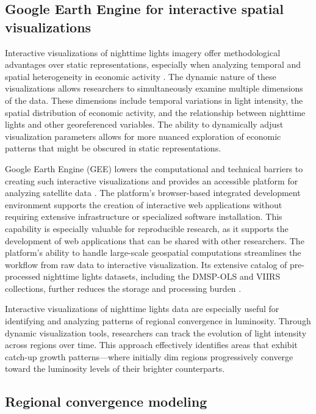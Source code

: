 \documentclass[
  a4paper, 
  twoside,
  review
]{article}
\begin{document}
\subsection{Google Earth Engine for interactive spatial
visualizations}\label{google-earth-engine-for-interactive-spatial-visualizations}

Interactive visualizations of nighttime lights imagery offer
methodological advantages over static representations, especially when
analyzing temporal and spatial heterogeneity in economic activity
\citep{donaldson_storeygard_remotesensing}. The dynamic nature of these
visualizations allows researchers to simultaneously examine multiple
dimensions of the data. These dimensions include temporal variations in
light intensity, the spatial distribution of economic activity, and the
relationship between nighttime lights and other georeferenced variables.
The ability to dynamically adjust visualization parameters allows for
more nuanced exploration of economic patterns that might be obscured in
static representations.

Google Earth Engine (GEE) lowers the computational and technical
barriers to creating such interactive visualizations and provides an
accessible platform for analyzing satellite data \citep{gorelick_gee}.
The platform's browser-based integrated development environment supports
the creation of interactive web applications without requiring extensive
infrastructure or specialized software installation. This capability is
especially valuable for reproducible research, as it supports the
development of web applications that can be shared with other
researchers. The platform's ability to handle large-scale geospatial
computations streamlines the workflow from raw data to interactive
visualization. Its extensive catalog of pre-processed nighttime lights
datasets, including the DMSP-OLS and VIIRS collections, further reduces
the storage and processing burden \citep{tamiminia_gee_review}.

Interactive visualizations of nighttime lights data are especially
useful for identifying and analyzing patterns of regional convergence in
luminosity. Through dynamic visualization tools, researchers can track
the evolution of light intensity across regions over time. This approach
effectively identifies areas that exhibit catch-up growth
patterns---where initially dim regions progressively converge toward the
luminosity levels of their brighter counterparts.

\subsection{Regional convergence
modeling}\label{regional-convergence-modeling}
\end{document}
